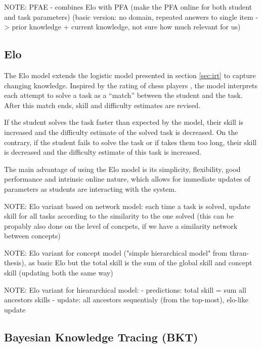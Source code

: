 NOTE: PFAE - combines Elo with PFA (make the PFA online for both student and task parameters)
(basic version: no domain, repeated answers to single item -> prior knowledge + current knowledge,
not sure how much relevant for us)



\subsection{Elo}
\label{sec:elo}

The Elo model \cite{alg.elo}
  extends the logistic model presented in section \ref{sec:irt}
  to capture changing knowledge.
Inspired by the rating of chess players \cite{elo-rating},
  the model interprets each attempt  to solve a task
  as a ``match'' between the student and the task.
After this match ends, skill and difficulty estimates are revised.

If the student solves the task faster than expected by the model,
  their skill is increased and the difficulty estimate of the solved task is decreased.
On the contrary, if the student fails to solve the task or if takes them too long,
  their skill is decreased and the difficulty estimate of this task is increased.


The main advantage of using the Elo model is its simplicity, flexibility,
  good performance and intrinsic online nature, which allows for immediate
  updates of parameters as students are interacting with the system.


NOTE: Elo variant based on network model: each time a task is solved, update skill for all tasks according to the similarity to the one solved (this can be propably also done on the level of concpets, if we have a similarity network between concepts)

NOTE: Elo variant for concept model ("simple hierarchical model" from thran-thesis),
as basic Elo but the total skill is the sum of the global skill and concept skill
(updating both the same way)

NOTE: Elo variant for hieararchical model:
- predictions: total skill = sum all ancestors skills
- update: all ancestors sequentialy (from the top-most), elo-like update

\subsection{Bayesian Knowledge Tracing (BKT)}
\label{sec:bkt}

